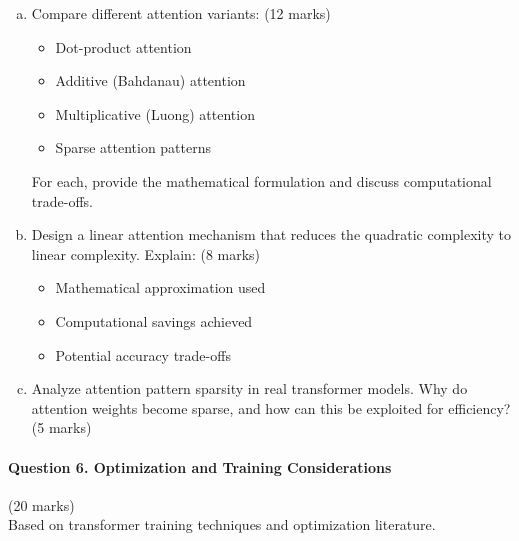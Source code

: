 \documentclass[12pt]{article}
\newcommand{\shortanswer}{\vspace{2cm}}
\newcommand{\mediumanswer}{\vspace{3cm}}
\newcommand{\journalspace}{\vspace{4.5cm}}
\begin{document}
\begin{enumerate}[(a)]
    \item Compare different attention variants: \hfill (12 marks)
    \begin{itemize}
        \item Dot-product attention
        \item Additive (Bahdanau) attention
        \item Multiplicative (Luong) attention
        \item Sparse attention patterns
    \end{itemize}
    
    For each, provide the mathematical formulation and discuss computational trade-offs.
    
    \journalspace
    
    \item Design a linear attention mechanism that reduces the quadratic complexity to linear complexity. Explain: \hfill (8 marks)
    \begin{itemize}
        \item Mathematical approximation used
        \item Computational savings achieved
        \item Potential accuracy trade-offs
    \end{itemize}
    
    \mediumanswer
    
    \item Analyze attention pattern sparsity in real transformer models. Why do attention weights become sparse, and how can this be exploited for efficiency? \hfill (5 marks)
    
    \shortanswer
\end{enumerate}

\newpage
\paragraph{Question 6. Optimization and Training Considerations}\hfill (20 marks)\\
Based on transformer training techniques and optimization literature.
\end{document}
